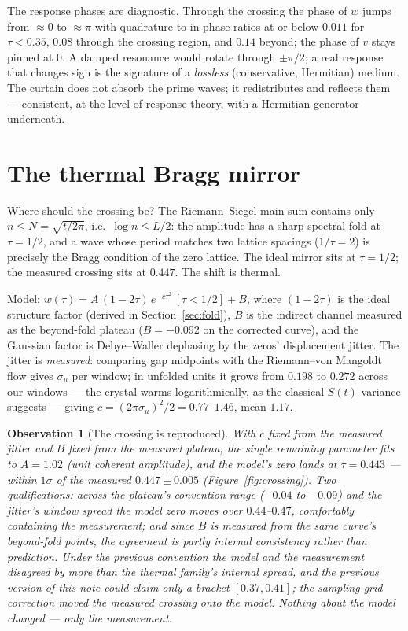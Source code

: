 \documentclass[12pt]{amsart}
\newtheorem{observation}{Observation}
\begin{document}
The response phases are diagnostic. Through the crossing the phase of
$w$ jumps from $\approx 0$ to $\approx \pi$ with quadrature-to-in-phase
ratios at or below $0.011$ for $\tau < 0.35$, $0.08$ through the crossing
region, and $0.14$ beyond; the phase of $v$ stays pinned at $0$. A
damped resonance would rotate through $\pm\pi/2$; a real response that
changes sign is the signature of a \emph{lossless} (conservative,
Hermitian) medium. The curtain does not absorb the prime waves; it
redistributes and reflects them --- consistent, at the level of response
theory, with a Hermitian generator underneath.

\section{The thermal Bragg mirror}

Where should the crossing be? The Riemann--Siegel main sum contains only
$n \le N = \sqrt{t/2\pi}$, i.e.\ $\log n \le L/2$: the amplitude has a
sharp spectral fold at $\tau = 1/2$, and a wave whose period matches two
lattice spacings ($1/\tau = 2$) is precisely the Bragg condition of the
zero lattice. The ideal mirror sits at $\tau = 1/2$; the measured
crossing sits at $0.447$. The shift is thermal.

Model: $w(\tau) = A\,(1 - 2\tau)\, e^{-c \tau^2}\,[\tau < 1/2] + B$,
where $(1-2\tau)$ is the ideal structure factor (derived in
Section~\ref{sec:fold}), $B$ is the indirect channel measured as the
beyond-fold plateau ($B = -0.092$ on the corrected curve), and the
Gaussian factor is Debye--Waller dephasing by the zeros' displacement
jitter. The jitter is \emph{measured}: comparing gap midpoints with the
Riemann--von Mangoldt flow gives $\sigma_u$ per window; in unfolded
units it grows from $0.198$ to $0.272$ across our windows --- the
crystal warms logarithmically, as the classical $S(t)$ variance suggests
--- giving $c = (2\pi \sigma_u)^2/2 = 0.77$--$1.46$, mean $1.17$.

\begin{observation}[The crossing is reproduced]
With $c$ fixed from the measured jitter and $B$ fixed from the measured
plateau, the single remaining parameter fits to $A = 1.02$ (unit
coherent amplitude), and the model's zero lands at $\tau = 0.443$ ---
within $1\sigma$ of the measured $0.447 \pm 0.005$
(Figure~\ref{fig:crossing}). Two qualifications: across the plateau's
convention range ($-0.04$ to $-0.09$) and the jitter's window spread the
model zero moves over $0.44$--$0.47$, comfortably containing the
measurement; and since $B$ is measured from the same curve's beyond-fold
points, the agreement is partly internal consistency rather than
prediction. Under the previous convention the model
and the measurement disagreed by more than the thermal family's internal
spread, and the previous version of this note could claim only a bracket
$[0.37, 0.41]$; the sampling-grid correction moved the measured crossing
onto the model. Nothing about the model changed --- only the
measurement.
\end{observation}
\end{document}
